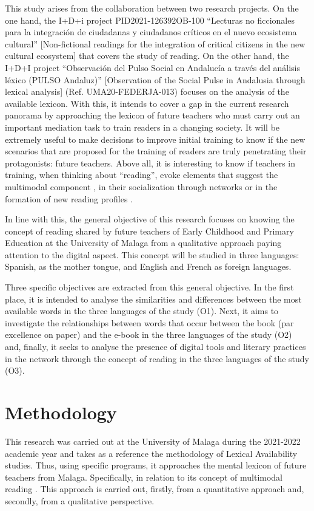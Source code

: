 \documentclass[english]{textolivre}
\begin{document}
This study arises from the collaboration between two research projects. On the one hand, the I+D+i project PID2021-126392OB-100 “Lecturas no ficcionales para la integración de ciudadanas y ciudadanos críticos en el nuevo ecosistema cultural” [Non-fictional readings for the integration of critical citizens in the new cultural ecosystem] that covers the study of reading. On the other hand, the I+D+I project “Observación del Pulso Social en Andalucía a través del análisis léxico (PULSO Andaluz)” [Observation of the Social Pulse in Andalusia through lexical analysis] (Ref. UMA20-FEDERJA-013) focuses on the analysis of the available lexicon. With this, it intends to cover a gap in the current research panorama by approaching the lexicon of future teachers who must carry out an important mediation task to train readers in a changing society. It will be extremely useful to make decisions to improve initial training to know if the new scenarios that are proposed for the training of readers are truly penetrating their protagonists: future teachers. Above all, it is interesting to know if teachers in training, when thinking about “reading”, evoke elements that suggest the multimodal component \cite{rowsell_social_2018}, in their socialization through networks \cite{cordon_garcia_socializacion_2023} or in the formation of new reading profiles \cite{putro_profiles_2018}.

In line with this, the general objective of this research focuses on knowing the concept of reading shared by future teachers of Early Childhood and Primary Education at the University of Malaga from a qualitative approach paying attention to the digital aspect. This concept will be studied in three languages: Spanish, as the mother tongue, and English and French as foreign languages.

Three specific objectives are extracted from this general objective. In the first place, it is intended to analyse the similarities and differences between the most available words in the three languages of the study (O1). Next, it aims to investigate the relationships between words that occur between the book (par excellence on paper) and the e-book in the three languages of the study (O2) and, finally, it seeks to analyse the presence of digital tools and literary practices in the network through the concept of reading in the three languages of the study (O3).

\section{Methodology}\label{sec-normas}
This research was carried out at the University of Malaga during the 2021-2022 academic year and takes as a reference the methodology of Lexical Availability studies. Thus, using specific programs, it approaches the mental lexicon of future teachers from Malaga. Specifically, in relation to its concept of multimodal reading \cite{rowsell_social_2018}. This approach is carried out, firstly, from a quantitative approach and, secondly, from a qualitative perspective. 
\end{document}

